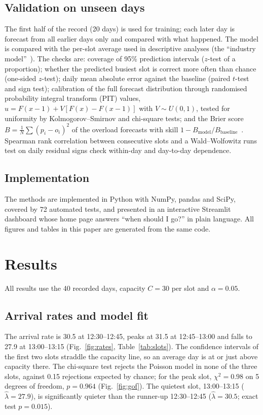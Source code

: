 \documentclass[conference,a4paper]{IEEEtran}
\begin{document}
\subsection{Validation on unseen days}
The first half of the record (20 days) is used for training; each later day is forecast from all earlier days only
and compared with what happened. The model is
compared with the per-slot average used in descriptive analyses (the ``industry model''~\cite{aldornoiman2009}). The
checks are: coverage of 95\% prediction intervals ($z$-test of a proportion); whether the predicted busiest slot is
correct more often than chance (one-sided $z$-test); daily mean absolute error against the baseline (paired $t$-test
and sign test); calibration of the full forecast distribution through randomised probability integral transform (PIT)
values, $u = F(x-1) + V[F(x) - F(x-1)]$ with $V \sim U(0,1)$, tested for uniformity by Kolmogorov--Smirnov and
chi-square tests; and the Brier score $B = \frac1N\sum (p_i - o_i)^2$ of the overload forecasts with skill
$1 - B_\text{model}/B_\text{baseline}$~\cite{brier1950,mcnulty1988}. Spearman rank correlation between consecutive
slots and a Wald--Wolfowitz runs test on daily residual signs check within-day and day-to-day dependence.

\subsection{Implementation}
The methods are implemented in Python with NumPy, pandas and SciPy, covered by 72 automated tests, and presented in an
interactive Streamlit dashboard whose home page answers ``when should I go?'' in plain language. All figures and tables
in this paper are generated from the same code.

\section{Results}\label{sec:results}
All results use the 40 recorded days, capacity $C = 30$ per slot and $\alpha = 0.05$.

\subsection{Arrival rates and model fit}
The arrival rate is 30.5 at 12:30--12:45, peaks at 31.5 at 12:45--13:00 and falls to 27.9 at 13:00--13:15
(Fig.~\ref{fig:rates}, Table~\ref{tab:slots}). The confidence intervals of the first two slots straddle the capacity
line, so an average day is at or just above capacity there. The chi-square test rejects the Poisson model in none of
the three slots, against 0.15 rejections expected by chance; for the peak slot, $\chi^2 = 0.98$ on 5 degrees of
freedom, $p = 0.964$ (Fig.~\ref{fig:gof}). The quietest slot, 13:00--13:15 ($\hat\lambda = 27.9$), is significantly
quieter than the runner-up 12:30--12:45 ($\hat\lambda = 30.5$; exact test $p = 0.015$).
\end{document}
